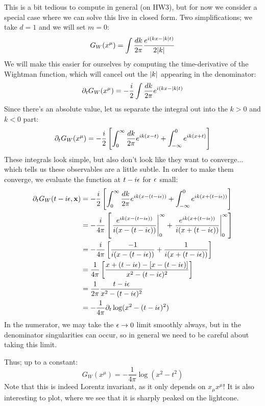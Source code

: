 This is a bit tedious to compute in general (on HW3), but for now we consider a special case where we can solve this live in closed form. Two simplifications; we take $d=1$ and we will set $m = 0$:
\begin{equation}
    G_W(x^\mu) = \int \frac{dk}{2\pi}\frac{e^{i(kx - \lvert k \rvert t)}}{2\lvert k \rvert}
\end{equation}
We will make this easier for ourselves by computing the time-derivative of the Wightman function, which will cancel out the $\lvert k \rvert$ appearing in the denominator:
\begin{equation}
    \partial_t G_W(x^\mu) = -\frac{i}{2}\int \frac{dk}{2\pi}e^{i(kx - \lvert k \rvert t)}
\end{equation}
Since there's an absolute value, let us separate the integral out into the $k > 0$ and $k < 0$ part:
\begin{equation}
    \partial_t G_W(x^\mu) = -\frac{i}{2}\left[\int_0^\infty \frac{dk}{2\pi}e^{ik(x - t)} + \int_{-\infty}^0 e^{ik(x + t)}\right]
\end{equation}
These integrals look simple, but also don't look like they want to converge... which tells us these observables are a little subtle. In order to make them converge, we evaluate the function at $t - i\epsilon$ for $\epsilon$ small:
\begin{equation}
    \begin{split}
        \partial_t G_W(t - i\epsilon, \mathbf{x}) &= -\frac{i}{2}\left[\int_0^\infty \frac{dk}{2\pi}e^{ik(x - (t-i\epsilon))} + \int_{-\infty}^0 e^{ik(x + (t-i\epsilon))}\right]
        \\ &= -\frac{i}{4\pi}\left[ \left.\frac{e^{ik(x - (t-i\epsilon))}}{i(x - (t - i\epsilon))} \right|_0^\infty +  \left.\frac{e^{ik(x + (t-i\epsilon))}}{i(x + (t - i\epsilon))} \right|_0^\infty \right]
        \\ &= - \frac{i}{4\pi}\left[\frac{-1}{i(x - (t-i\epsilon))} + \frac{1}{i(x + (t-i\epsilon))}\right]
        \\ &= \frac{1}{4\pi}\left[\frac{x + (t - i\epsilon) - [x - (t-i\epsilon)]}{x^2 - (t-i\epsilon)^2}\right]
        \\ &= \frac{1}{2\pi}\frac{t-i\epsilon}{x^2 - (t - i\epsilon)^2} 
        \\ &= -\frac{1}{4\pi}\partial_t \log(x^2 - (t-i\epsilon)^2)
    \end{split}
\end{equation}
In the numerator, we may take the $\epsilon \to 0$ limit smoothly always, but in the denominator singularities can occur, so in general we need to be careful about taking this limit.

Thus; up to a constant:
\begin{equation}
    \boxed{G_W(x^\mu) = -\frac{1}{4\pi}\log(x^2 - t^2)}
\end{equation}
Note that this is indeed Lorentz invariant, as it only depends on $x_\mu x^\mu$! It is also interesting to plot, where we see that it is sharply peaked on the lightcone.

